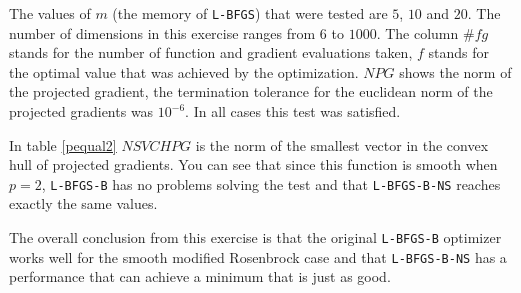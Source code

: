 The values of $m$ (the memory of \texttt{L-BFGS}) that were tested are $5$, $10$ and $20$. The number of dimensions in this exercise ranges from $6$ to $1000$. The column $\#fg$ stands for the number of function and gradient evaluations taken, $f$ stands for the optimal value that was achieved by the optimization. $NPG$ shows the norm of the projected gradient, the termination tolerance for the euclidean norm of the projected gradients was $10^{-6}$. In all cases this test was satisfied. 

In table \ref{pequal2} $NSVCHPG$ is the norm of the smallest vector in the convex hull of projected gradients. You can see that since this function is smooth when $p = 2$, \texttt{L-BFGS-B} has no problems solving the test and that \texttt{L-BFGS-B-NS} reaches exactly the same values.

The overall conclusion from this exercise is that the original \texttt{L-BFGS-B} optimizer works well for the smooth modified Rosenbrock case and that \texttt{L-BFGS-B-NS} has a performance that can achieve a minimum that is just as good.


